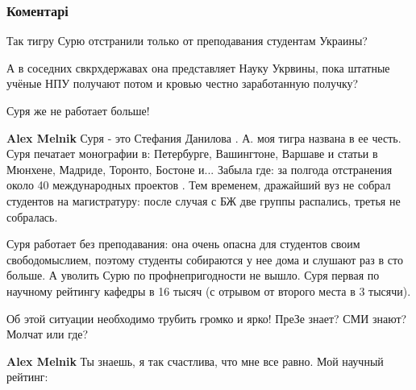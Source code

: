  
 
 
 
 
\subsubsection{Коментарі}

\begin{itemize}
Так тигру Сурю отстранили только от преподавания студентам Украины?

А в соседних свкрхдержавах она представляет Науку Укрвины, пока штатные учёные
НПУ получают потом и кровью честно заработанную получку?

Суря же не работает больше!

\begin{itemize}
\textbf{Alex Melnik} Суря - это Стефания Данилова . А. моя тигра названа в ее честь. Суря печатает монографии в: Петербурге, Вашингтоне, Варшаве и статьи в Мюнхене, Мадриде, Торонто, Бостоне и... Забыла где: за полгода отстранения около 40 международных проектов . Тем временем, дражайший вуз не собрал студентов на магистратуру: после случая с БЖ две группы распались, третья не собралась.

Суря работает без преподавания: она очень опасна для студентов своим свободомыслием, поэтому студенты собираются у нее дома и слушают раз в сто больше. А уволить Сурю по профнепригодности не вышло. Суря первая по научному рейтингу кафедры в 16 тысяч (с отрывом от второго места в 3 тысячи).

Об этой ситуации необходимо трубить громко и ярко!
ПреЗе знает?
СМИ знают?
Молчат или где?

\textbf{Alex Melnik} Ты знаешь, я так счастлива, что мне все равно. Мой научный рейтинг:


\end{itemize}
\end{itemize}
